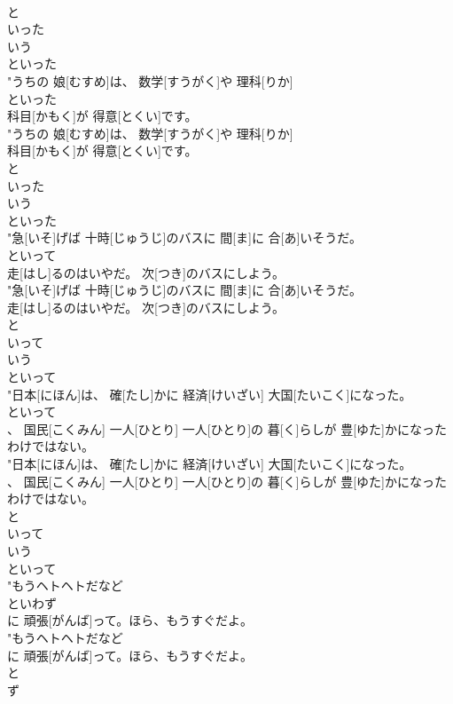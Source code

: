 \documentclass[8pt]{extreport}
\begin{document}
\begin{CJK}{UTF8}{min}
\\	と 
\\	いった 
\\	いう	
\\	といった
\\	"うちの 娘[むすめ]は、 数学[すうがく]や 理科[りか]
\\	といった
\\	科目[かもく]が 得意[とくい]です。
\\	"うちの 娘[むすめ]は、 数学[すうがく]や 理科[りか]
\\	科目[かもく]が 得意[とくい]です。
\\	と 
\\	いった 
\\	いう	
\\	といった
\\	"急[いそ]げば 十時[じゅうじ]のバスに 間[ま]に 合[あ]いそうだ。
\\	といって
\\	走[はし]るのはいやだ。 次[つき]のバスにしよう。
\\	"急[いそ]げば 十時[じゅうじ]のバスに 間[ま]に 合[あ]いそうだ。
\\	走[はし]るのはいやだ。 次[つき]のバスにしよう。
\\	と 
\\	いって 
\\	いう	
\\	といって
\\	"日本[にほん]は、 確[たし]かに 経済[けいざい] 大国[たいこく]になった。
\\	といって
\\	、 国民[こくみん] 一人[ひとり] 一人[ひとり]の 暮[く]らしが 豊[ゆた]かになったわけではない。
\\	"日本[にほん]は、 確[たし]かに 経済[けいざい] 大国[たいこく]になった。
\\	、 国民[こくみん] 一人[ひとり] 一人[ひとり]の 暮[く]らしが 豊[ゆた]かになったわけではない。
\\	と 
\\	いって 
\\	いう	
\\	といって
\\	"もうヘトヘトだなど
\\	といわず
\\	に 頑張[がんば]って。ほら、もうすぐだよ。
\\	"もうヘトヘトだなど
\\	に 頑張[がんば]って。ほら、もうすぐだよ。
\\	と 
\\	ず 

\end{CJK}
\end{document}
